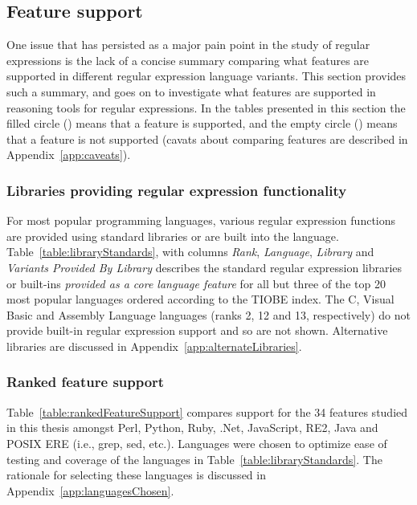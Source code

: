 \subsection{Feature support}
\label{sec:featureSupport}



One issue that has persisted as a major pain point in the study of regular expressions is the lack of a concise summary comparing what features are supported in different regular expression language variants.  This section provides such a summary, and goes on to investigate what features are supported in reasoning tools for regular expressions.  In the tables presented in this section the filled circle (\yes) means that a feature is supported, and the empty circle (\no) means that a feature is not supported (cavats about comparing features are described in Appendix~\ref{app:caveats}).

\subsubsection{Libraries providing regular expression functionality}
For most popular programming languages, various regular expression functions are provided using standard libraries or are built into the language.  Table~\ref{table:libraryStandards}, with columns \emph{Rank}, \emph{Language}, \emph{Library} and \emph{Variants Provided By Library} describes the standard regular expression libraries or built-ins \emph{provided as a core language feature} for all but three of the top 20 most popular languages ordered according to the TIOBE index. The C, Visual Basic and Assembly Language languages (ranks 2, 12 and 13, respectively) do not provide built-in regular expression support and so are not shown.  Alternative libraries are discussed in Appendix~\ref{app:alternateLibraries}.





\afterpage{\clearpage}

\subsubsection{Ranked feature support}
\label{sec:rankedFeatureSupport}
Table~\ref{table:rankedFeatureSupport} compares support for the 34 features studied in this thesis amongst Perl, Python, Ruby, .Net, JavaScript, RE2, Java and POSIX ERE (i.e., grep, sed, etc.).  Languages were chosen to optimize ease of testing and coverage of the languages in Table~\ref{table:libraryStandards}.  The rationale for selecting these languages is discussed in Appendix~\ref{app:languagesChosen}.

